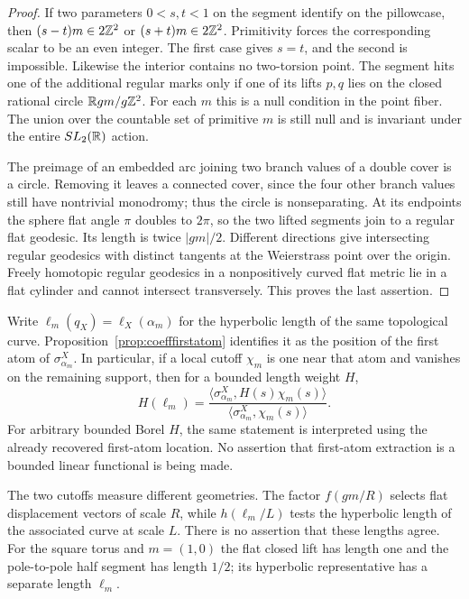 \begin{proof}
If two parameters $0<s,t<1$ on the segment identify on the pillowcase,
then $(s-t)m\in2\mathbb Z^2$ or $(s+t)m\in2\mathbb Z^2$. Primitivity forces
the corresponding scalar to be an even integer. The first case gives
$s=t$, and the second is impossible. Likewise the interior contains no
two-torsion point. The segment hits one of the additional regular marks
only if one of its lifts $p,q$ lies on the closed rational circle
$\mathbb R gm/g\mathbb Z^2$. For each $m$ this is a null condition in the point
fiber. The union over the countable set of primitive $m$ is still null
and is invariant under the entire $SL_2(\mathbb R)$ action.

The preimage of an embedded arc joining two branch values of a double
cover is a circle. Removing it leaves a connected cover, since the four
other branch values still have nontrivial monodromy; thus the circle is
nonseparating. At its endpoints the sphere flat angle $\pi$ doubles to
$2\pi$, so the two lifted segments join to a regular flat geodesic.
Its length is twice $|gm|/2$. Different directions give intersecting
regular geodesics with distinct tangents at the Weierstrass point over
the origin. Freely homotopic regular geodesics in a nonpositively curved
flat metric lie in a flat cylinder and cannot intersect transversely.
This proves the last assertion.
\end{proof}

Write $\ell_m(q_X)=\ell_X(\alpha_m)$ for the hyperbolic length of the
same topological curve. Proposition~\ref{prop:coefffirstatom} identifies
it as the position of the first atom of $\sigma^X_{\alpha_m}$. In
particular, if a local cutoff $\chi_m$ is one near that atom and
vanishes on the remaining support, then for a
bounded length weight $H$,
\begin{equation}
 H(\ell_m)=
 \frac{\langle\sigma^X_{\alpha_m},H(s)\chi_m(s)\rangle}
      {\langle\sigma^X_{\alpha_m},\chi_m(s)\rangle}.
 \label{eq:polearccoefficientweight}
\end{equation}
For arbitrary bounded Borel $H$, the same statement is interpreted
using the already recovered first-atom location. No assertion that
first-atom extraction is a bounded linear functional is being made.

The two cutoffs measure different geometries. The factor $f(gm/R)$
selects flat displacement vectors of scale $R$, while
$h(\ell_m/L)$ tests the hyperbolic length of the associated curve
at scale $L$. There is no assertion that these lengths agree.
For the square torus and $m=(1,0)$ the flat closed lift has length
one and the pole-to-pole half segment has length $1/2$; its
hyperbolic representative has a separate length $\ell_m$.

